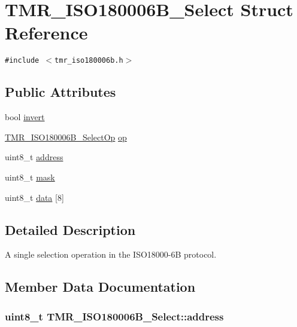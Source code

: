 \hypertarget{struct_t_m_r___i_s_o180006_b___select}{
\section{TMR\_\-ISO180006B\_\-Select Struct Reference}
\label{struct_t_m_r___i_s_o180006_b___select}
}
{\tt \#include $<$tmr\_\-iso180006b.h$>$}

\subsection*{Public Attributes}
\begin{CompactItemize}
\item 
bool \hyperlink{struct_t_m_r___i_s_o180006_b___select_7798ef47714274299461115039418bc0}{invert}
\item 
\hyperlink{tmr__iso180006b_8h_cfb53ac1c38fae6b8085ed03f6c9b705}{TMR\_\-ISO180006B\_\-SelectOp} \hyperlink{struct_t_m_r___i_s_o180006_b___select_0b84ba81a8847ce74017c14a5adf516c}{op}
\item 
uint8\_\-t \hyperlink{struct_t_m_r___i_s_o180006_b___select_87b5435770f12f85fde9000a0005ed34}{address}
\item 
uint8\_\-t \hyperlink{struct_t_m_r___i_s_o180006_b___select_2f73d5038704751e6e9c10c1e832f20d}{mask}
\item 
uint8\_\-t \hyperlink{struct_t_m_r___i_s_o180006_b___select_1b8c2c94c0403b0ff5057c2d8fef03cc}{data} \mbox{[}8\mbox{]}
\end{CompactItemize}


\subsection{Detailed Description}
A single selection operation in the ISO18000-6B protocol. 

\subsection{Member Data Documentation}
\hypertarget{struct_t_m_r___i_s_o180006_b___select_87b5435770f12f85fde9000a0005ed34}{
\subsubsection[{address}]{\setlength{\rightskip}{0pt plus 5cm}uint8\_\-t {\bf TMR\_\-ISO180006B\_\-Select::address}}}
\label{struct_t_m_r___i_s_o180006_b___select_87b5435770f12f85fde9000a0005ed34}


